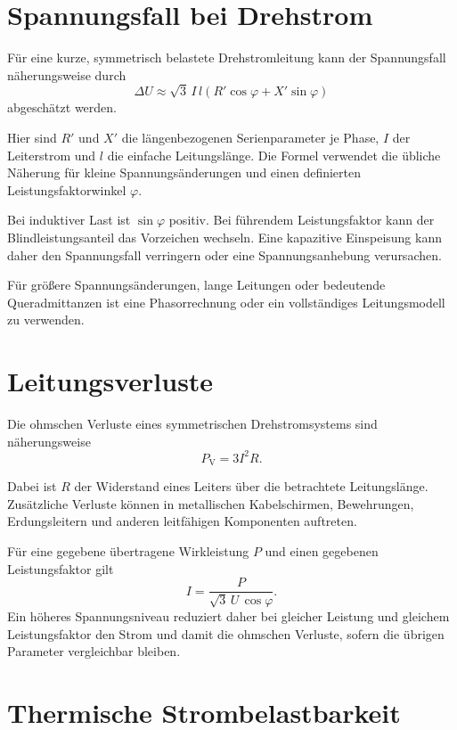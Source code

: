 \section{Spannungsfall bei Drehstrom}

Für eine kurze, symmetrisch belastete Drehstromleitung kann der Spannungsfall
näherungsweise durch
\[
  \Delta U\approx\sqrt{3}\,I\,l
  \left(R'\cos\varphi+X'\sin\varphi\right)
\]
abgeschätzt werden.

Hier sind \(R'\) und \(X'\) die längenbezogenen Serienparameter je Phase,
\(I\) der Leiterstrom und \(l\) die einfache Leitungslänge. Die Formel
verwendet die übliche Näherung für kleine Spannungsänderungen und einen
definierten Leistungsfaktorwinkel \(\varphi\).

Bei induktiver Last ist \(\sin\varphi\) positiv. Bei führendem Leistungsfaktor
kann der Blindleistungsanteil das Vorzeichen wechseln. Eine kapazitive
Einspeisung kann daher den Spannungsfall verringern oder eine Spannungsanhebung
verursachen.

Für größere Spannungsänderungen, lange Leitungen oder bedeutende Queradmittanzen
ist eine Phasorrechnung oder ein vollständiges Leitungsmodell zu verwenden.

\section{Leitungsverluste}

Die ohmschen Verluste eines symmetrischen Drehstromsystems sind näherungsweise
\[
  P_{\mathrm V}=3I^2R.
\]

Dabei ist \(R\) der Widerstand eines Leiters über die betrachtete Leitungslänge.
Zusätzliche Verluste können in metallischen Kabelschirmen, Bewehrungen,
Erdungsleitern und anderen leitfähigen Komponenten auftreten.

Für eine gegebene übertragene Wirkleistung \(P\) und einen gegebenen
Leistungsfaktor gilt
\[
  I=\frac{P}{\sqrt{3}\,U\,\cos\varphi}.
\]
Ein höheres Spannungsniveau reduziert daher bei gleicher Leistung und gleichem
Leistungsfaktor den Strom und damit die ohmschen Verluste, sofern die übrigen
Parameter vergleichbar bleiben.

\section{Thermische Strombelastbarkeit}

